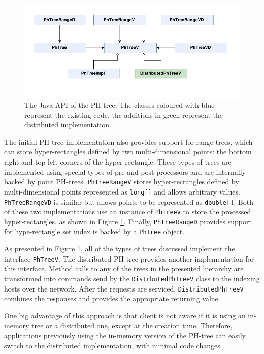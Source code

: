 \documentclass[11pt,a4paper]{globis-book}
\begin{document}
\begin{figure}[h]
    \centering 
    \includegraphics[scale=1]{images/PH-Tree-API}
    \caption{The Java API of the PH-tree. The classes coloured with blue represent the existing code, the additions in green represent the distributed implementation.}
    \label{fig:PH-tree-Java-API}
\end{figure}

The initial PH-tree implementation also provides support for range trees, which can store hyper-rectangles defined by two multi-dimensional points: the bottom right and top left corners of the hyper-rectangle. These types of trees are implemented using special types of pre and post processors and are internally backed by point PH-trees. \texttt{PhTreeRangeV} stores hyper-rectangles defined by multi-dimensional points represented as \texttt{long[]} and allows arbitrary values. \texttt{PhTreeRangeVD} is similar but allows points to be represented as \texttt{double[]}. Both of these two implementations use an instance of \texttt{PhTreeV} to store the processed hyper-rectangles, as shown in Figure \ref{fig:PH-tree-Java-API}. Finally, \texttt{PhTreeRangeD} provides support for hype-rectangle set index is backed by a \texttt{PhTree} object. 

As presented in Figure \ref{fig:PH-tree-Java-API}, all of the types of trees discussed implement the interface \texttt{PhTreeV}. The distributed PH-tree provides another implementation for this interface. Method calls to any of the trees in the presented hierarchy are transformed into commands send by the \texttt{DistrbutedPhTreeV} class to the indexing hosts over the network. After the requests are serviced, \texttt{DistributedPhTreeV} combines the responses and provides the appropriate returning value. 

One big advantage of this approach is that client is not aware if it is using an in-memory tree or a distributed one, except at the creation time. Therefore, applications previously using the in-memory version of the PH-tree can easily switch to the distributed implementation, with minimal code changes. 
\end{document}

